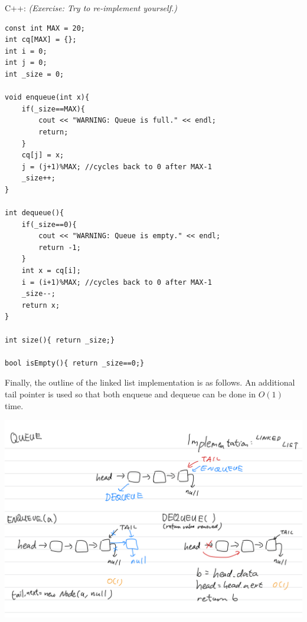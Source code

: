 C++: \textit{(Exercise:  Try to re-implement yourself.)}

\begin{lstlisting}
const int MAX = 20; 
int cq[MAX] = {};
int i = 0;
int j = 0;
int _size = 0;

void enqueue(int x){
    if(_size==MAX){
        cout << "WARNING: Queue is full." << endl;
        return;
    }
    cq[j] = x;
    j = (j+1)%MAX; //cycles back to 0 after MAX-1
    _size++;
}

int dequeue(){
    if(_size==0){
        cout << "WARNING: Queue is empty." << endl;
        return -1;
    }
    int x = cq[i];
    i = (i+1)%MAX; //cycles back to 0 after MAX-1
    _size--;
    return x;
}

int size(){ return _size;}

bool isEmpty(){ return _size==0;}
\end{lstlisting}


Finally, the outline of the linked list implementation is as follows. An additional tail pointer is used so that both enqueue and dequeue can be done in $O(1)$ time.

\includegraphics[width=15cm]{images/ch6-qlinkedlist.png}